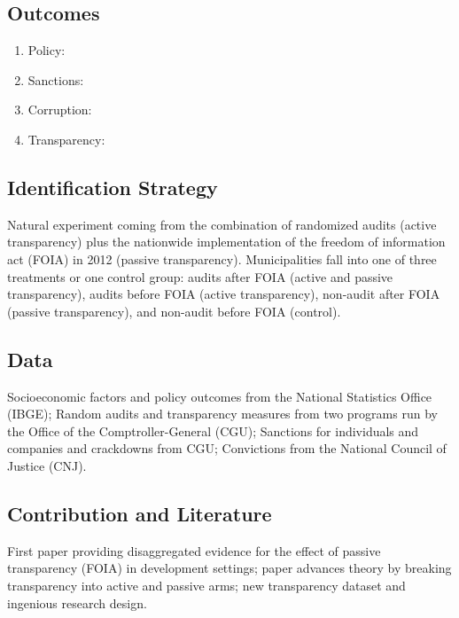 \documentclass[]{article}
\begin{document}
\hypertarget{outcomes}{%
\subsection{Outcomes}\label{outcomes}}

\begin{enumerate}
\item
  Policy:
\item
  Sanctions:
\item
  Corruption:
\item
  Transparency:
\end{enumerate}

\hypertarget{identification-strategy}{%
\subsection{Identification Strategy}\label{identification-strategy}}

Natural experiment coming from the combination of randomized audits
(active transparency) plus the nationwide implementation of the freedom
of information act (FOIA) in 2012 (passive transparency). Municipalities
fall into one of three treatments or one control group: audits after
FOIA (active and passive transparency), audits before FOIA (active
transparency), non-audit after FOIA (passive transparency), and
non-audit before FOIA (control).

\hypertarget{data}{%
\subsection{Data}\label{data}}

Socioeconomic factors and policy outcomes from the National Statistics
Office (IBGE); Random audits and transparency measures from two programs
run by the Office of the Comptroller-General (CGU); Sanctions for
individuals and companies and crackdowns from CGU; Convictions from the
National Council of Justice (CNJ).

\hypertarget{contribution-and-literature}{%
\subsection{Contribution and
Literature}\label{contribution-and-literature}}

First paper providing disaggregated evidence for the effect of passive
transparency (FOIA) in development settings; paper advances theory by
breaking transparency into active and passive arms; new transparency
dataset and ingenious research design.
\end{document}
